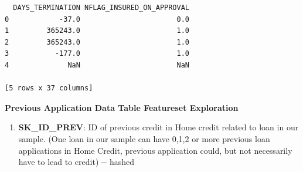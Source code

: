 \documentclass[11pt]{article}
\providecommand{\tightlist}{%
      \setlength{\itemsep}{0pt}\setlength{\parskip}{0pt}}
\begin{document}
\begin{verbatim}
  DAYS_TERMINATION NFLAG_INSURED_ON_APPROVAL  
0            -37.0                       0.0  
1         365243.0                       1.0  
2         365243.0                       1.0  
3           -177.0                       1.0  
4              NaN                       NaN  

[5 rows x 37 columns]
    \end{verbatim}

    
    \textbf{Previous Application Data Table Featureset Exploration}

\begin{enumerate}
\def\labelenumi{\arabic{enumi}.}
\tightlist
\item
  \textbf{SK\_ID\_PREV}: ID of previous credit in Home credit related to
  loan in our sample. (One loan in our sample can have 0,1,2 or more
  previous loan applications in Home Credit, previous application could,
  but not necessarily have to lead to credit) -\/- hashed
\end{enumerate}
\end{document}
